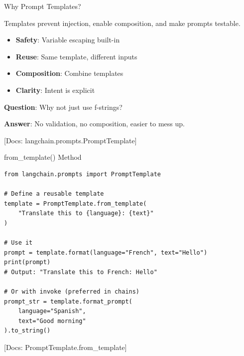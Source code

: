 \documentclass[aspectratio=169,11pt]{beamer}
\newcommand{\docref}[1]{{\scriptsize\color{docgray}[Docs: #1]}}
\begin{document}
\begin{frame}{Why Prompt Templates?}
  \begin{conceptbox}
    Templates prevent injection, enable composition, and make prompts testable.
  \end{conceptbox}

  \begin{itemize}
    \setlength{\itemsep}{1pt}
    \item \textbf{Safety}: Variable escaping built-in
    \item \textbf{Reuse}: Same template, different inputs
    \item \textbf{Composition}: Combine templates
    \item \textbf{Clarity}: Intent is explicit
  \end{itemize}

  \vspace{0.08cm}
  \textbf{Question}: Why not just use f-strings?

  \textbf{Answer}: No validation, no composition, easier to mess up.

  \docref{langchain.prompts.PromptTemplate}
\end{frame}

\begin{frame}[fragile]{from\_template() Method}
  \begin{codebox}
    \begin{lstlisting}
from langchain.prompts import PromptTemplate

# Define a reusable template
template = PromptTemplate.from_template(
    "Translate this to {language}: {text}"
)

# Use it
prompt = template.format(language="French", text="Hello")
print(prompt)
# Output: "Translate this to French: Hello"

# Or with invoke (preferred in chains)
prompt_str = template.format_prompt(
    language="Spanish",
    text="Good morning"
).to_string()
    \end{lstlisting}
  \end{codebox}

  \docref{PromptTemplate.from\_template}
\end{frame}
\end{document}
